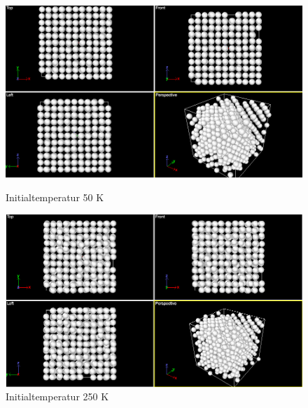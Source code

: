 \documentclass[paper=a4, fontsize=11pt]{scrartcl} %
\numberwithin{equation}{section} %
\numberwithin{figure}{section} %
\numberwithin{table}{section} %
\begin{document}
 
 \FloatBarrier
\begin{figure}[!htb]
  \includegraphics[width=\linewidth]{T=50}
  \caption{Initialtemperatur 50 K}\label{50}
\endminipage\hfill
{}
  \includegraphics[width=\linewidth]{T=250}
  \caption{Initialtemperatur 250 K}\label{250}
\endminipage\hfill
\end{figure}
 \FloatBarrier
 
\end{document}
